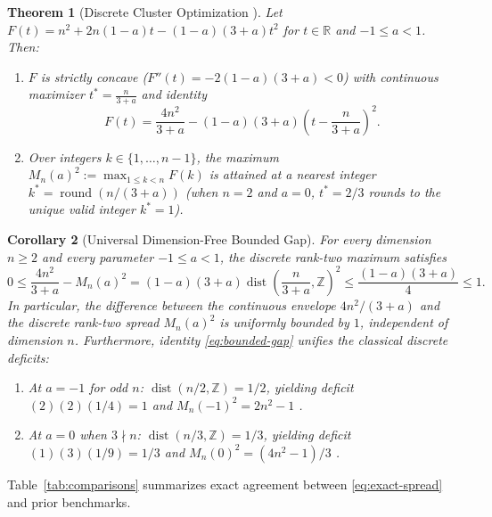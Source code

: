 \documentclass[11pt,reqno]{article}
\newtheorem{theorem}{Theorem}[section]
\newtheorem{corollary}[theorem]{Corollary}
\theoremstyle{definition}
\newcommand{\R}{\mathbb{R}}
\newcommand{\Z}{\mathbb{Z}}
\begin{document}
\begin{theorem}[Discrete Cluster Optimization {\cite{fallat2012spread}}]\label{thm:optimal-k}
Let $F(t) = n^2 + 2n(1-a)t - (1-a)(3+a)t^2$ for $t \in \R$ and $-1 \le a < 1$. Then:
\begin{enumerate}
    \item $F$ is strictly concave ($F''(t) = -2(1-a)(3+a) < 0$) with continuous maximizer $t^* = \frac{n}{3+a}$ and identity
    \begin{equation}\label{eq:F-vertex}
    F(t) = \frac{4n^2}{3+a} - (1-a)(3+a)\left(t - \frac{n}{3+a}\right)^2.
    \end{equation}
    \item Over integers $k \in \{1, \dots, n-1\}$, the maximum $M_n(a)^2 := \max_{1 \le k < n} F(k)$ is attained at a nearest integer $k^* = \operatorname{round}(n/(3+a))$ (when $n = 2$ and $a = 0$, $t^* = 2/3$ rounds to the unique valid integer $k^* = 1$).
\end{enumerate}
\end{theorem}

\begin{corollary}[Universal Dimension-Free Bounded Gap]\label{cor:bounded-gap}
For every dimension $n \ge 2$ and every parameter $-1 \le a < 1$, the discrete rank-two maximum satisfies
\begin{equation}\label{eq:bounded-gap}
0 \le \frac{4n^2}{3+a} - M_n(a)^2 = (1-a)(3+a)\operatorname{dist}\left(\frac{n}{3+a}, \Z\right)^2 \le \frac{(1-a)(3+a)}{4} \le 1.
\end{equation}
In particular, the difference between the continuous envelope $4n^2/(3+a)$ and the discrete rank-two spread $M_n(a)^2$ is uniformly bounded by $1$, independent of dimension $n$. Furthermore, identity \eqref{eq:bounded-gap} unifies the classical discrete deficits:
\begin{enumerate}
    \item At $a = -1$ for odd $n$: $\operatorname{dist}(n/2, \Z) = 1/2$, yielding deficit $(2)(2)(1/4) = 1$ and $M_n(-1)^2 = 2n^2 - 1$ \cite{zhan2005extremal}.
    \item At $a = 0$ when $3 \nmid n$: $\operatorname{dist}(n/3, \Z) = 1/3$, yielding deficit $(1)(3)(1/9) = 1/3$ and $M_n(0)^2 = (4n^2 - 1)/3$ \cite{corless2025bohemian}.
\end{enumerate}
\end{corollary}

Table~\ref{tab:comparisons} summarizes exact agreement between \eqref{eq:exact-spread} and prior benchmarks.
\end{document}
